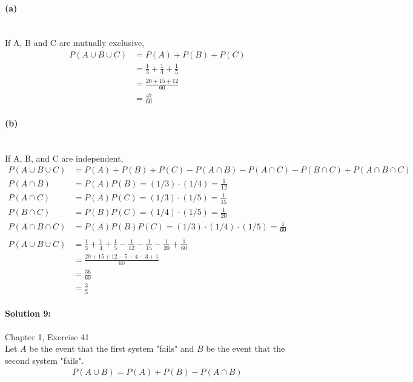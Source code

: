 \documentclass[a4paper]{article}
\begin{document}
\paragraph{(a)} ~\\

\indent If A, B and C are mutually exclusive,
\begin{align*}
P(A \cup B \cup C) &= P(A) + P(B) + P(C) \\
                   &= \frac{1}{3} + \frac{1}{4} + \frac{1}{5} \\
                   &= \frac{20+15+12}{60} \\
                   &= \frac{47}{60}
\end{align*}

\paragraph{(b)} ~\\

\indent If A, B, and C are independent,
\begin{align*}
P(A \cup B \cup C) &= P(A) + P(B) + P(C) - P(A \cap B) - P(A \cap C) - P(B \cap C) + P(A \cap B \cap C) \\
       P(A \cap B) &= P(A)P(B) = (1/3) \cdot (1/4) = \frac{1}{12} \\
       P(A \cap C) &= P(A)P(C) = (1/3) \cdot (1/5) = \frac{1}{15} \\
       P(B \cap C) &= P(B)P(C) = (1/4) \cdot (1/5) = \frac{1}{20} \\
P(A \cap B \cap C) &= P(A)P(B)P(C) = (1/3) \cdot (1/4) \cdot (1/5) = \frac{1}{60} \\ \\
P(A \cup B \cup C) &= \frac{1}{3} + \frac{1}{4} + \frac{1}{5} - \frac{1}{12} - \frac{1}{15} - \frac{1}{20} + \frac{1}{60} \\
                   &= \frac{20+15+12-5-4-3+1}{60} \\
                   &= \frac{36}{60} \\
                   &= \frac{3}{5}
\end{align*}

\paragraph{Solution 9:}
Chapter 1, Exercise 41 \\

\indent Let $A$ be the event that the first system "fails" and $B$ be the event that the second system "fails".
\begin{align*}
P(A \cup B) = P(A) + P(B) - P(A \cap B)
\end{align*}
\end{document}
